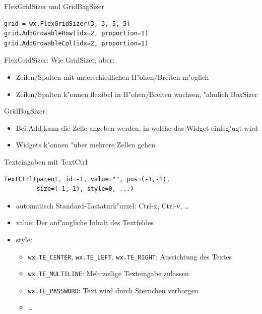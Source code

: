 \begin{frame}[fragile]{FlexGridSizer und GridBagSizer}
\begin{lstlisting}[style=Python]
grid = wx.FlexGridSizer(3, 3, 5, 5)
grid.AddGrowableRow(idx=2, proportion=1)
grid.AddGrowableCol(idx=2, proportion=1)
\end{lstlisting}
\alert{FlexGridSizer}: Wie GridSizer, aber:
\begin{itemize}
\item Zeilen/Spalten mit unterschiedlichen H"ohen/Breiten m"oglich
\item Zeilen/Spalten k"onnen flexibel in H"ohen/Breiten wachsen, "ahnlich BoxSizer
\end{itemize}
\vspace{3mm}
\alert{GridBagSizer}:
\begin{itemize}
\item Bei \alert{Add} kann die Zelle angeben werden, in welche das Widget einfeg"ugt wird
\item Widgets k"onnen "uber mehrere Zellen gehen
\end{itemize}
\end{frame}

\begin{frame}[fragile]{Texteingaben mit TextCtrl}
\begin{lstlisting}[style=Python]
TextCtrl(parent, id=-1, value="", pos=(-1,-1),
         size=(-1,-1), style=0, ...)
\end{lstlisting}
\begin{itemize}
\item automatisch Standard-Tastaturk"urzel: Ctrl-x, Ctrl-v, \dots
\item \alert{value}: Der anf"angliche Inhalt des Textfeldes
\item \alert{style}:
  \begin{itemize}
    \item \lstinline{wx.TE_CENTER}, \lstinline{wx.TE_LEFT}, \lstinline{wx.TE_RIGHT}: Ausrichtung des Textes
    \item \lstinline{wx.TE_MULTILINE}: Mehrzeilige Texteingabe zulassen
    \item \lstinline{wx.TE_PASSWORD}: Text wird durch Sternchen verborgen
    \item \dots
  \end{itemize}
\end{itemize}
\end{frame}

